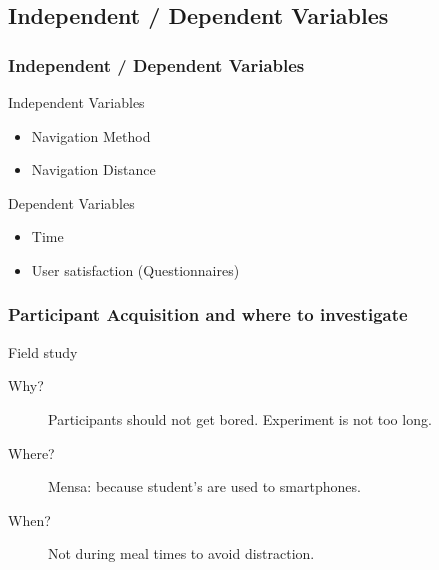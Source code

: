 \documentclass{beamer}
\begin{document}
\subsection{Independent / Dependent Variables}
\begin{frame}
        \frametitle{Independent / Dependent Variables}
        \begin{block}{Independent Variables}
                \begin{itemize}
                        \item Navigation Method
                        \item Navigation Distance
                \end{itemize}
        \end{block}
        \begin{block}{Dependent Variables}
                \begin{itemize}
                        \item Time 
                        \item User satisfaction (Questionnaires)
                \end{itemize}
        \end{block}
\end{frame}

\begin{frame}
        \frametitle{Participant Acquisition and where to investigate}
        \begin{block}{Field study}
                \begin{description}
                        \item[Why?] Participants should not get bored.
                                Experiment is not too long.
                        \item[Where?] Mensa: because student's are used to smartphones.
                        \item[When?] Not during meal times to avoid distraction.
                \end{description}
        \end{block}
\end{frame}
\end{document}
